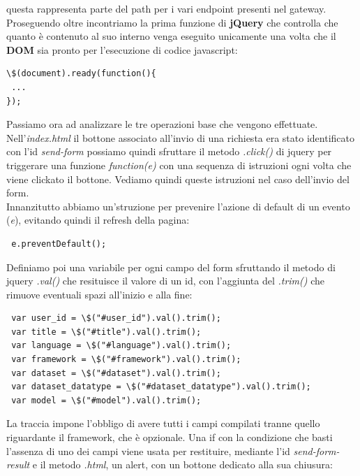 \documentclass[a4paper,12pt, oneside]{book}
\begin{document}
questa rappresenta parte del path per i vari endpoint presenti nel gateway.\\
Proseguendo oltre incontriamo la prima funzione di \textbf{jQuery} che controlla che quanto
è contenuto al suo interno venga eseguito unicamente una volta che il \textbf{DOM}
sia pronto per l'esecuzione di codice javascript:
\begin{shaded}
\begin{verbatim}
\$(document).ready(function(){
 ...
});
\end{verbatim}
\end{shaded}
Passiamo ora ad analizzare le tre operazioni base che vengono effettuate.\\
Nell'\textit{index.html} il bottone associato all'invio di una richiesta
era stato identificato con l'id \textit{send-form} possiamo quindi sfruttare il metodo
\textit{.click()} di jquery per triggerare una funzione \textit{function(e)
} con una sequenza di istruzioni ogni volta che viene clickato il bottone.
Vediamo quindi queste istruzioni nel caso dell'invio del form.\\
Innanzitutto abbiamo un'struzione per prevenire l'azione di default di un evento (\textit{e}), evitando quindi il refresh della pagina:
\begin{shaded}
\begin{verbatim}
 e.preventDefault();
\end{verbatim}
\end{shaded}
Definiamo poi una variabile per ogni campo del form sfruttando il metodo di jquery
\textit{.val()} che resituisce il valore di un id, con l'aggiunta del \textit{.trim()} che rimuove eventuali spazi all'inizio e alla fine:
\begin{shaded}
\begin{verbatim}
 var user_id = \$("#user_id").val().trim();
 var title = \$("#title").val().trim();
 var language = \$("#language").val().trim();
 var framework = \$("#framework").val().trim();
 var dataset = \$("#dataset").val().trim();
 var dataset_datatype = \$("#dataset_datatype").val().trim();
 var model = \$("#model").val().trim();
\end{verbatim}
\end{shaded}
La traccia impone l'obbligo di avere tutti i campi compilati tranne quello riguardante
il framework, che è opzionale. Una if con la condizione che basti l'assenza
di uno dei campi viene usata per restituire, mediante l'id \textit{send-form-result}
e il metodo \textit{.html}, un alert, con un bottone dedicato alla sua chiusura:
\end{document}
